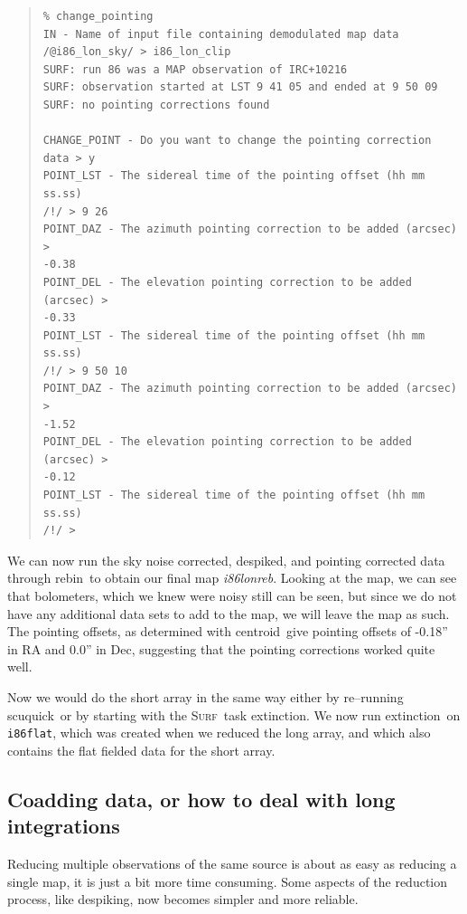 \documentclass[twoside,11pt]{article}
\newenvironment{myquote}{\begin{quote}\begin{small}}{\end{small}\end{quote}}
\newcommand{\surf}{\xref{\textsc{Surf}}{sun216}{}}
\newcommand{\task}[1]{\textsf{#1}}
\newcommand{\rebin}{\xref{\task{rebin}}{sun216}{REBIN}}
\newcommand{\ext}{\xref{\task{extinction}}{sun216}{EXTINCTION}}
\newcommand{\scuquick}{\xref{\task{scuquick}}{sun216}{SCUQUICK}}
\newcommand{\centroid}{\xref{\task{centroid}}{sun95}{CENTROID}}
\newcommand{\xref}[3]{#1}
\newcommand{\xlabel}[1]{}
\renewcommand{\_}{\texttt{\symbol{95}}}
\begin{document}
\begin{myquote}
\begin{verbatim}
% change_pointing
IN - Name of input file containing demodulated map data 
/@i86_lon_sky/ > i86_lon_clip
SURF: run 86 was a MAP observation of IRC+10216
SURF: observation started at LST 9 41 05 and ended at 9 50 09
SURF: no pointing corrections found

CHANGE_POINT - Do you want to change the pointing correction data > y
POINT_LST - The sidereal time of the pointing offset (hh mm ss.ss) 
/!/ > 9 26 
POINT_DAZ - The azimuth pointing correction to be added (arcsec) > 
-0.38
POINT_DEL - The elevation pointing correction to be added (arcsec) > 
-0.33
POINT_LST - The sidereal time of the pointing offset (hh mm ss.ss) 
/!/ > 9 50 10
POINT_DAZ - The azimuth pointing correction to be added (arcsec) > 
-1.52
POINT_DEL - The elevation pointing correction to be added (arcsec) > 
-0.12
POINT_LST - The sidereal time of the pointing offset (hh mm ss.ss) 
/!/ > 
\end{verbatim}
\end{myquote}

We can now run the sky noise corrected, despiked, and pointing corrected data
through \rebin\ to obtain our final map \textit{i86\_lon\_reb}.  Looking at
the map, we can see that bolometers, which we knew  were noisy still can
be seen, but since we do not have any additional data sets to add to the map,
we will leave the map as such.  The pointing offsets, as determined with
\centroid\ give pointing offsets of -0.18'' in RA and 0.0'' in Dec, suggesting
that the pointing corrections worked quite well.

Now we would do the short array in the same way either by re--running
\scuquick\ or by starting with the \surf\ task \ext. We now run \ext\
on \texttt{i86\_flat}, which was created when we reduced the long
array, and which also contains the flat fielded data for the short
array.

\subsection{\xlabel{Coadding_data}Coadding data, or how to deal with 
long integrations \label{Coadding_data}}

Reducing multiple observations of the same source is about as easy as
reducing a single map, it is just a bit more time consuming. Some
aspects of the reduction process, like despiking, now becomes simpler
and more reliable.
\end{document}
